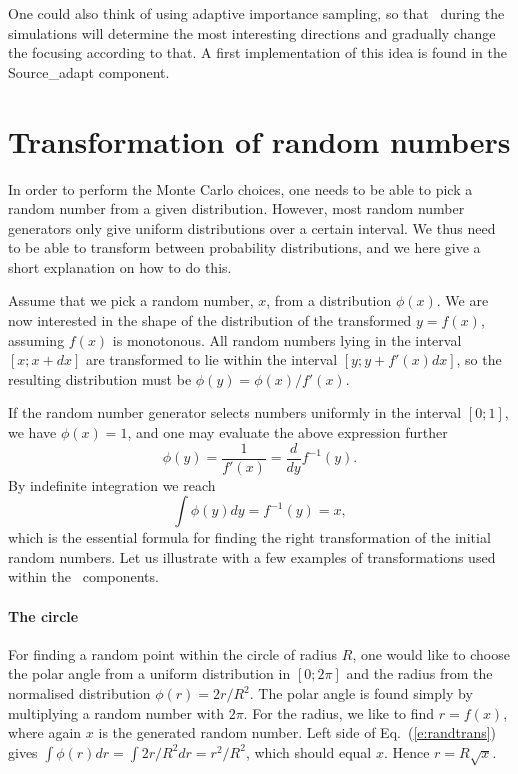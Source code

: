 One could also think of using adaptive importance sampling, %
so that \MCS\ during the simulations will determine 
the most interesting directions and gradually change 
the focusing according to that. A first implementation of this idea is
found in the Source\_adapt component.%

\section{Transformation of random numbers}
In order to perform the Monte Carlo choices, one needs to be able to 
pick a random number from a given distribution. However, most
random number generators only give
uniform distributions over a certain interval.
We thus need to be able to transform between probability distributions,
and we here give a short explanation on how to do this.

Assume that we pick a random number, $x$, from a distribution $\phi(x)$.
We are now interested in the shape of the distribution of the
transformed $y=f(x)$, assuming $f(x)$ is monotonous. 
All random numbers lying in the interval $[x; x+dx]$
are transformed to lie within the interval $[y; y+f'(x)dx]$, so the
resulting distribution must be $\phi(y) = \phi(x) / f'(x)$.

If the random number generator selects numbers uniformly in the interval
$[0; 1]$, we have $\phi(x) = 1$, and
one may evaluate the above expression further
\begin{equation}
\phi(y) = \frac{1}{f'(x)} = \frac{d}{dy} f^{-1}(y) . 
\end{equation}
By indefinite integration we reach
\begin{equation}
\label{e:randtrans}
\int \phi(y) dy = f^{-1}(y) = x ,
\end{equation}
which is the essential formula for finding the right transformation
of the initial random numbers.
Let us illustrate with a few examples of transformations used within the
\MCS\ components. 

\paragraph{The circle}
For finding a random point within the
circle of radius $R$, one would like to choose the polar angle from a uniform
distribution in $[0; 2\pi]$ and the radius from the normalised distribution
$\phi(r)=2r/R^2$. 
The polar angle is found simply by multiplying a random number
with $2\pi$. For the radius, we like to find $r=f(x)$, where again $x$
is the generated random number. Left side of Eq.~(\ref{e:randtrans}) gives
$\int \phi(r) dr = \int 2 r/R^2 dr = r^2/R^2$, which should equal $x$.
Hence $r = R\sqrt{x}$.



